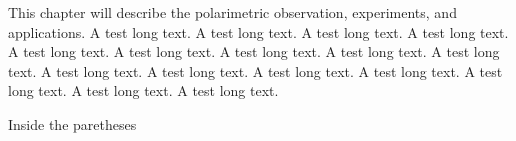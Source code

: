 This chapter will describe the polarimetric observation, experiments, and applications. A test long text. A test long text. A test long text. A test long text. A test long text. A test long text. A test long text. A test long text. A test long text. A test long text. A test long text. A test long text. A test long text. A test long text. A test long text. A test long text. 

\cite{1929PhDT.........9L,1955PhDT........37D,1970GeCAS...1.2127G,1986MNRAS.218...75G}

Inside the paretheses \citep{2016MNRAS.456..248C}